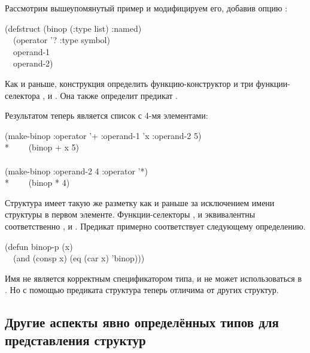 Рассмотрим вышеупомянутый пример  и модифицируем его, добавив
опцию :
\begin{lisp}
(defstruct (binop (:type list) :named) \\
~~(operator '? :type symbol) \\
~~operand-1 \\
~~operand-2)
\end{lisp}
Как и раньше, конструкция определить функцию-конструктор  и три
функции-селектора  ,  и
. Она также определит предикат .

Результатом  теперь является список с 4-мя элементами:
\begin{lisp}
(make-binop :operator '+ :operand-1 'x :operand-2 5) \\*
~~~\EV\ (binop + x 5) \\
\\
(make-binop :operand-2 4 :operator '*) \\*
~~~\EV\ (binop * {\nil} 4)
\end{lisp}
Структура имеет такую же разметку как и раньше за исключением имени структуры в
первом элементе.
Функции-селекторы
, и  эквивалентны
соответственно ,  и .
Предикат  примерно соответствует следующему определению.
\begin{lisp}
(defun binop-p (x) \\
~~(and (consp x) (eq (car x) 'binop)))
\end{lisp}
Имя  не является корректным спецификатором типа, и не может
использоваться в . Но с помощью предиката структура теперь отличима 
от других структур. 

\subsection{Другие аспекты явно определённых типов для представления структур}
\label{DEFSTRUCT-INITIAL-OFFSET}

